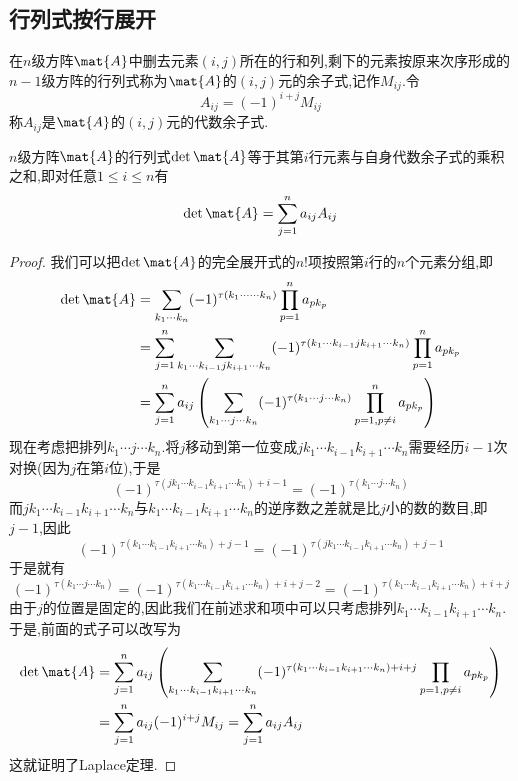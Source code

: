 \documentclass{ctexart}
\begin{document}
\subsection{行列式按行展开}
\begin{definition}[余子式和代数余子式]
    在$n$级方阵$\mat{A}$中删去元素$(i,j)$所在的行和列,剩下的元素按原来次序形成的$n-1$级方阵的行列式称为$\mat{A}$的$(i,j)$元的余子式,记作$M_{ij}$.令
    \[A_{ij}=(-1)^{i+j}M_{ij}\]
    称$A_{ij}$是$\mat{A}$的$(i,j)$元的代数余子式.
\end{definition}
\begin{theorem}[Laplace定理]
    $n$级方阵$\mat{A}$的行列式$\det\mat{A}$等于其第$i$行元素与自身代数余子式的乘积之和,即对任意$1\leqslant i\leqslant n$有
    \[\det\mat{A}=\sum_{j=1}^{n}a_{ij}A_{ij}\]
\end{theorem}
\begin{proof}
    我们可以把$\det\mat{A}$的完全展开式的$n!$项按照第$i$行的$n$个元素分组,即
    \[\begin{aligned}
        \det\mat{A}
        &= \sum_{k_1\cdots k_n}(-1)^{\tau\left(k_1\cdots\cdots k_n\right)}\prod_{p=1}^{n}a_{pk_p} \\
        &= \sum_{j=1}^{n}\sum_{k_1\cdots k_{i-1}jk_{i+1}\cdots k_n}(-1)^{\tau\left(k_1\cdots k_{i-1}jk_{i+1}\cdots k_n\right)}\prod_{p=1}^{n}a_{pk_p} \\
        &= \sum_{j=1}^{n}a_{ij}\left(\sum_{k_1\cdots j\cdots k_n}(-1)^{\tau\left(k_1\cdots j\cdots k_n\right)}\prod_{p=1,p\neq i}^{n}a_{pk_p}\right)
    \end{aligned}\]
    现在考虑把排列$k_1\cdots j\cdots k_n$.将$j$移动到第一位变成$jk_1\cdots k_{i-1}k_{i+1}\cdots k_n$需要经历$i-1$次对换(因为$j$在第$i$位),于是
    \[(-1)^{\tau\left(jk_1\cdots k_{i-1}k_{i+1}\cdots k_n\right)+i-1}=(-1)^{\tau\left(k_1\cdots j\cdots k_n\right)}\]
    而$jk_1\cdots k_{i-1}k_{i+1}\cdots k_n$与$k_1\cdots k_{i-1}k_{i+1}\cdots k_n$的逆序数之差就是比$j$小的数的数目,即$j-1$,因此
    \[(-1)^{\tau\left(k_1\cdots k_{i-1}k_{i+1}\cdots k_n\right)+j-1}=(-1)^{\tau\left(jk_1\cdots k_{i-1}k_{i+1}\cdots k_n\right)+j-1}\]
    于是就有
    \[(-1)^{\tau\left(k_1\cdots j\cdots k_n\right)}=(-1)^{\tau\left(k_1\cdots k_{i-1}k_{i+1}\cdots k_n\right)+i+j-2}=(-1)^{\tau\left(k_1\cdots k_{i-1}k_{i+1}\cdots k_n\right)+i+j}\]
    由于$j$的位置是固定的,因此我们在前述求和项中可以只考虑排列$k_1\cdots k_{i-1}k_{i+1}\cdots k_n$.于是,前面的式子可以改写为
    \[\begin{aligned}
        \det\mat{A}
        &= \sum_{j=1}^{n}a_{ij}\left(\sum_{k_1\cdots k_{i-1}k_{i+1}\cdots k_n}(-1)^{\tau\left(k_1\cdots k_{i-1}k_{i+1}\cdots k_n\right)+i+j}\prod_{p=1,p\neq i}a_{pk_{p}}\right) \\
        &= \sum_{j=1}^{n}a_{ij}(-1)^{i+j}M_{ij}=\sum_{j=1}^{n}a_{ij}A_{ij}
    \end{aligned}\]
    这就证明了Laplace定理.
\end{proof}
\end{document}
